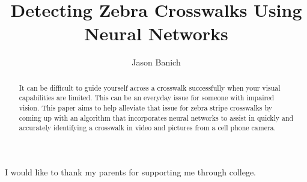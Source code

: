 \documentclass[12pt]{ucthesis}
\begin{document}

\title{Detecting Zebra Crosswalks Using Neural Networks}
\author{Jason Banich}
  
 
    



\maketitle

\begin{frontmatter}

\copyrightpage

\committeemembershippage

\begin{abstract}
It can be difficult to guide yourself across a crosswalk successfully when your visual capabilities are limited. This can be an everyday issue for someone with impaired vision. This paper aims to help alleviate that issue for zebra stripe crosswalks by coming up with an algorithm that incorporates neural networks to assist in quickly and accurately identifying a crosswalk in video and pictures from a cell phone camera. 


\end{abstract}

\begin{acknowledgements}
I would like to thank my parents for supporting me through college.
\end{acknowledgements}


\tableofcontents


\listoftables

\listoffigures

\end{frontmatter}
\end{document}
